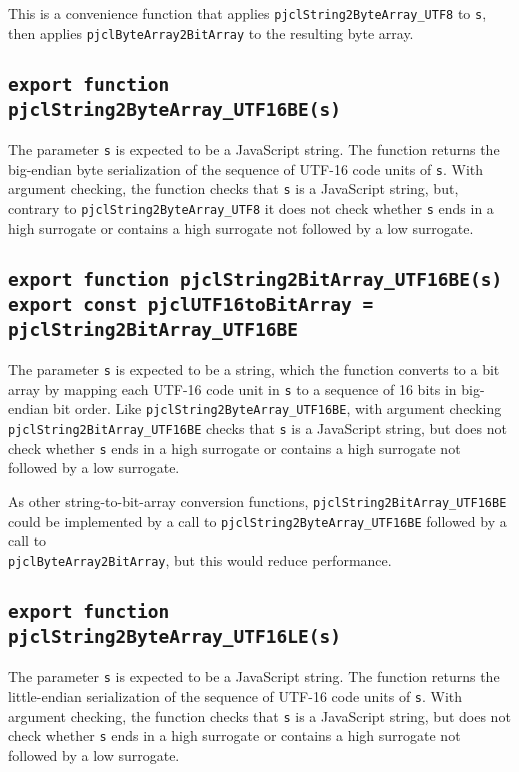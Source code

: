 \documentclass[12pt]{article}
\begin{document}
This is a convenience function that applies {\tt pjclString2ByteArray\_UTF8} to {\tt s},
then applies {\tt pjclByteArray2BitArray} to the resulting byte array.

\subsection{\tt export function pjclString2ByteArray\_UTF16BE(s)}

The parameter {\tt s} is expected to be a JavaScript string.  
The function returns the big-endian byte serialization of the sequence of
UTF-16 code units of {\tt s}.  With argument checking, the function
checks that {\tt s} is a JavaScript string, but, contrary to
{\tt pjclString2ByteArray\_UTF8} it does not check whether {\tt s} ends
in a high surrogate or contains a high surrogate not followed by a low
surrogate.

\subsection{\tt export function pjclString2BitArray\_UTF16BE(s)\\export const pjclUTF16toBitArray = pjclString2BitArray\_UTF16BE}

The parameter {\tt s} is expected to be a string, which the
function converts to a bit array by mapping each UTF-16 code unit in
{\tt s} to a sequence of 16 bits in big-endian bit order.  Like 
{\tt pjclString2ByteArray\_UTF16BE}, with argument checking
{\tt pjclString2BitArray\_UTF16BE}
checks that {\tt s} is a JavaScript string, but does not check whether {\tt s} ends
in a high surrogate or contains a high surrogate not followed by a low
surrogate.

As other string-to-bit-array conversion functions, {\tt pjclString2BitArray\_UTF16BE}
could be implemented by a call to {\tt pjclString2ByteArray\_UTF16BE}
followed by a call to\\
{\tt pjclByteArray2BitArray}, but this would reduce performance.

\subsection{\tt export function pjclString2ByteArray\_UTF16LE(s)}

The parameter {\tt s} is expected to be a JavaScript string.  
The function returns the little-endian serialization of the sequence of
UTF-16 code units of {\tt s}.  With argument checking, the function
checks that {\tt s} is a JavaScript string, but does not check whether {\tt s} ends
in a high surrogate or contains a high surrogate not followed by a low
surrogate.
\end{document}
